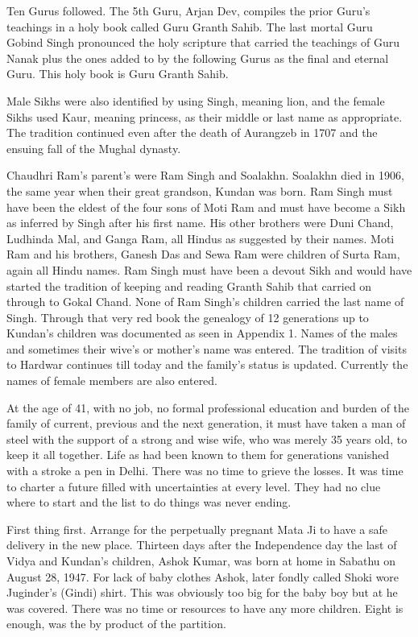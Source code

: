 Ten Gurus followed. The 5th Guru, Arjan Dev, compiles the prior Guru’s teachings in a holy book called Guru Granth Sahib. The last mortal Guru Gobind Singh pronounced the holy scripture that carried the teachings of Guru Nanak plus the ones added to by the following Gurus as the final and eternal Guru. This holy book is Guru Granth Sahib. 

Male Sikhs were also identified by using Singh, meaning lion, and the female Sikhs used Kaur, meaning princess, as their middle or last  name as appropriate. The tradition continued even after the death of Aurangzeb in 1707 and the ensuing fall of the Mughal dynasty.  

Chaudhri Ram's parent's were Ram Singh and Soalakhn. Soalakhn died in 1906, the same year when their great grandson, Kundan was born.  Ram Singh must have been the eldest of the four sons of Moti Ram and must have become a Sikh as inferred by Singh after his first name. His other brothers were Duni Chand, Ludhinda Mal, and Ganga Ram, all Hindus as suggested by their names. Moti Ram and his brothers, Ganesh Das and Sewa Ram were children of Surta Ram, again all Hindu names. Ram Singh must have been a devout Sikh and would have started the tradition of keeping and reading Granth Sahib that carried on through to Gokal Chand. None of Ram Singh’s children carried the last name of Singh.  Through that very red  book the genealogy of 12 generations up to Kundan's children was documented as seen in Appendix 1. Names of the males and sometimes their wive's or mother's name was entered. The tradition of visits to Hardwar continues till today and the family's status is updated. Currently the names of female members are also entered. 

At the age of 41, with no job, no formal professional  education and burden of the family of current, previous and the next generation, it must have taken a man of steel with the support of a strong and wise wife, who was merely 35 years old, to keep it all together. Life as had been known to them for generations vanished with a stroke a pen in Delhi. There was no time to grieve the losses. It was time to charter a future filled with uncertainties at every level. They had no clue where to start and the list to do things was never ending. 

First thing first. Arrange for the perpetually pregnant Mata Ji to have a safe delivery in the new place. Thirteen days after the Independence day the last of Vidya and Kundan's children, Ashok Kumar, was born at home in Sabathu on August 28, 1947. For lack of baby clothes Ashok, later fondly called Shoki wore Juginder’s (Gindi) shirt. This was obviously too big for the baby boy but at he was covered. There was no time or resources to have any more children. Eight is enough, was the by product of the partition. 

